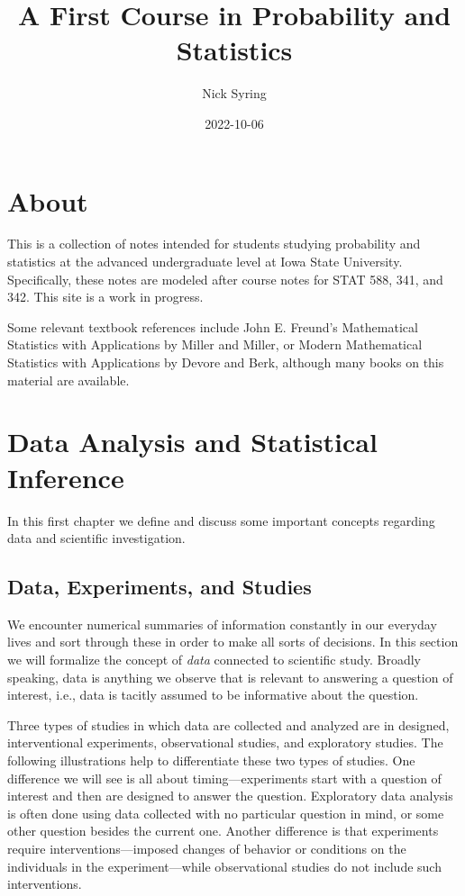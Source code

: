 \documentclass[
]{book}
\title{A First Course in Probability and Statistics}
\author{Nick Syring}
\date{2022-10-06}
\begin{document}
\maketitle

{
\setcounter{tocdepth}{1}
\tableofcontents
}
\hypertarget{about}{%
\chapter{About}\label{about}}

This is a collection of notes intended for students studying probability and statistics at the advanced undergraduate level at Iowa State University. Specifically, these notes are modeled after course notes for STAT 588, 341, and 342. This site is a work in progress.

Some relevant textbook references include John E. Freund's Mathematical Statistics with Applications by Miller and Miller, or Modern Mathematical Statistics with Applications by Devore and Berk, although many books on this material are available.

\hypertarget{data-analysis-and-statistical-inference}{%
\chapter{Data Analysis and Statistical Inference}\label{data-analysis-and-statistical-inference}}

In this first chapter we define and discuss some important concepts regarding data and scientific investigation.

\hypertarget{data-experiments-and-studies}{%
\section{Data, Experiments, and Studies}\label{data-experiments-and-studies}}

We encounter numerical summaries of information constantly in our everyday lives and sort through these in order to make all sorts of decisions. In this section we will formalize the concept of \emph{data} connected to scientific study. Broadly speaking, data is anything we observe that is relevant to answering a question of interest, i.e., data is tacitly assumed to be informative about the question.

Three types of studies in which data are collected and analyzed are in designed, interventional experiments, observational studies, and exploratory studies. The following illustrations help to differentiate these two types of studies. One difference we will see is all about timing---experiments start with a question of interest and then are designed to answer the question. Exploratory data analysis is often done using data collected with no particular question in mind, or some other question besides the current one. Another difference is that experiments require interventions---imposed changes of behavior or conditions on the individuals in the experiment---while observational studies do not include such interventions.
\end{document}

